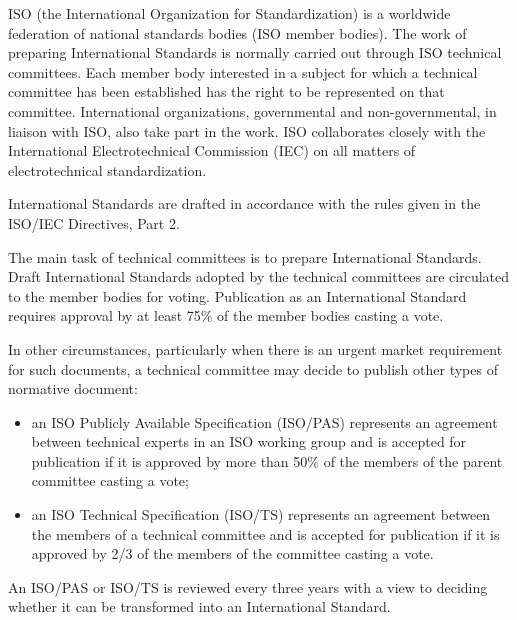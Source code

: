ISO (the International Organization for Standardization) is a worldwide federation of national standards
bodies (ISO member bodies). The work of preparing International Standards is normally carried out
through ISO technical committees. Each member body interested in a subject for which a technical
committee has been established has the right to be represented on that committee. International organizations,
governmental and non-governmental, in liaison with ISO, also take part in the work. ISO
collaborates closely with the International Electrotechnical Commission (IEC) on all matters of electrotechnical
standardization.

International Standards are drafted in accordance with the rules given in the ISO/IEC Directives, Part 2.

The main task of technical committees is to prepare International Standards. Draft International Standards
adopted by the technical committees are circulated to the member bodies for voting. Publication
as an International Standard requires approval by at least 75\% of the member bodies casting a vote.

In other circumstances, particularly when there is an urgent market requirement for such documents, a
technical committee may decide to publish other types of normative document:

\begin{itemize}
\item
an ISO Publicly Available Specification (ISO/PAS) represents an agreement between technical experts
in an ISO working group and is accepted for publication if it is approved by more than 50\%
of the members of the parent committee casting a vote;
\item
an ISO Technical Specification (ISO/TS) represents an agreement between the members of a technical
committee and is accepted for publication if it is approved by 2/3 of the members of the
committee casting a vote.
\end{itemize}

An ISO/PAS or ISO/TS is reviewed every three years with a view to deciding whether it can be transformed
into an International Standard.
